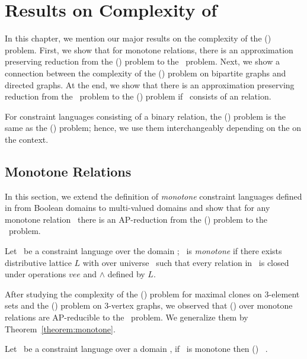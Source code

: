 \chapter{Results on Complexity of \cbis}
In this chapter, we mention our major results on the complexity 
of the \ccsp(\mrelset) problem. First, we show that for monotone relations, there is an
approximation preserving reduction from the \ccsp(\mrelset) problem to the \cbis\ problem.
Next, we show a connection between the complexity of the \chom(\mH) problem on bipartite graphs
and directed graphs.
At the end, we show that there is an approximation preserving reduction from the \cbis\ problem 
to the \ccsp(\mrelset) problem if \mrelset\ consists of an \emph{\RBA} relation.

For constraint languages consisting of a binary relation, the \ccsp(\mrelset) problem is
the same as the \chom(\mH) problem; hence, we use them interchangeably depending on the on the context.

\section{Monotone Relations}
In this section, we extend the definition of \emph{monotone} constraint languages defined in
\cite{Trichotomy} from Boolean domains to multi-valued domains and show that for
any monotone relation \mrelset\ there is an AP-reduction from the \ccsp(\mrelset) problem to
the \cbis\ problem.

\begin{defi}
Let \mrelset\ be a constraint language over the domain \mD; \mrelset\ is \emph{monotone}
if there exists distributive lattice \(L\) with over universe \mD\ such that every relation 
in \mrelset\ is closed under operations \(vee\) and \(\wedge\) defined by \(L\)\@.
\end{defi}

After studying the complexity of the \ccsp(\mrelset) problem for maximal clones on 3-element sets
and the \chom(\mH) problem on 3-vertex graphs, we observed that \ccsp(\mrelset) over 
monotone relations are AP-reducible to the \cds\ problem. We generalize them by
Theorem~\ref{theorem:monotone}\@.

\begin{theorem} \label{theorem:monotone}
Let \mrelset\ be a constraint language over a domain \mD, if 
\mrelset\ is monotone then \ccsp(\mrelset) \maple\ \cbis\@.
\end{theorem}

